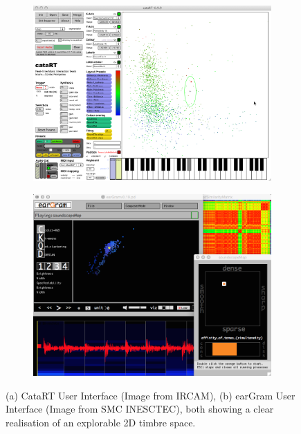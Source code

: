 \begin{figure}
\centering
\begin{subfigure}[b]{0.9\textwidth}
   \includegraphics[width=1\linewidth]{ch04_sota/figures/catart.png}
   \caption{}
   \label{fig:catart} 
\end{subfigure}

\begin{subfigure}[b]{0.9\textwidth}
   \includegraphics[width=1\linewidth]{ch04_sota/figures/eargram.png}
   \caption{}
   \label{fig:eargram}
\end{subfigure}

\caption[CataRT and Eargram]{(a) CataRT User Interface (Image from IRCAM), (b) earGram User Interface (Image from  SMC INESCTEC), both showing a clear realisation of an explorable 2D timbre space.}
\end{figure}


